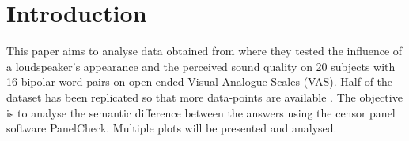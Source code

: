 \chapter*{Introduction}
\label{introduction}
This paper aims to analyse data obtained from \cite{Christiansen2011} where they tested the influence of a loudspeaker's appearance and the perceived sound quality on 20 subjects with 16 bipolar word-pairs on open ended Visual Analogue Scales (VAS). Half of the dataset has been replicated so that more data-points are available . The objective is to analyse the semantic difference between the answers using the censor panel software PanelCheck. Multiple plots will be presented and analysed.